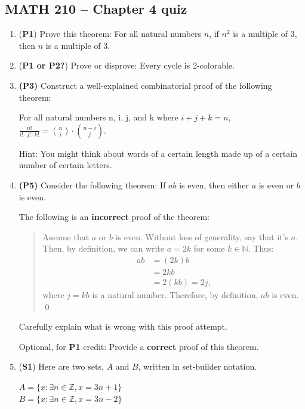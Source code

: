 \documentclass[12pt]{article}
\begin{document}
\pagestyle{empty}
\begin{center}
\section*{MATH 210 -- Chapter 4 quiz}
\end{center}

\begin{enumerate}

\item (\textbf{P1}) 
Prove this theorem: For all natural numbers $n$, if $n^2$ is a multiple of 3, then $n$ is a multiple of 3.

\item (\textbf{P1 or P2?})
Prove or disprove: Every cycle is 2-colorable.

\item \textbf{(P3)} Construct a well-explained combinatorial proof of the following theorem:

For all natural numbers n, i, j, and k where $i+j+k=n$, $\frac{n!}{i! \cdot j! \cdot k!} = \binom{n}{i} \cdot \binom{n-i}{j}$.

Hint: You might think about words of a certain length made up of a certain number of certain letters.

\item \textbf{(P5)} Consider the following theorem: If $ab$ is even, then either $a$ is even or $b$ is even.

The following is an \textbf{incorrect} proof of the theorem:
\begin{quotation}
Assume that $a$ or $b$ is even. Without loss of generality, say that it's $a$. Then, by definition, we can write $a = 2k$ for some $k\in\mathbb{N}$. Thus:
\begin{align*}
    ab &= (2k) b \\
    &= 2kb \\
    &= 2(kb) = 2j,
\end{align*}
where $j = kb$ is a natural number. Therefore, by definition, $ab$ is even. \qed
\end{quotation}
Carefully explain what is wrong with this proof attempt.

Optional, for \textbf{P1} credit: Provide a \textbf{correct} proof of this theorem.


\item (\textbf{S1})
Here are two sets, $A$ and $B$, written in set-builder notation.  
\begin{center}
$A=\{x: \exists n \in \mathbb{Z}, x=3n+1\}$ \\
$B=\{x: \exists n \in \mathbb{Z}, x=3n-2\}$
\end{center}


\end{enumerate}
\end{document}
